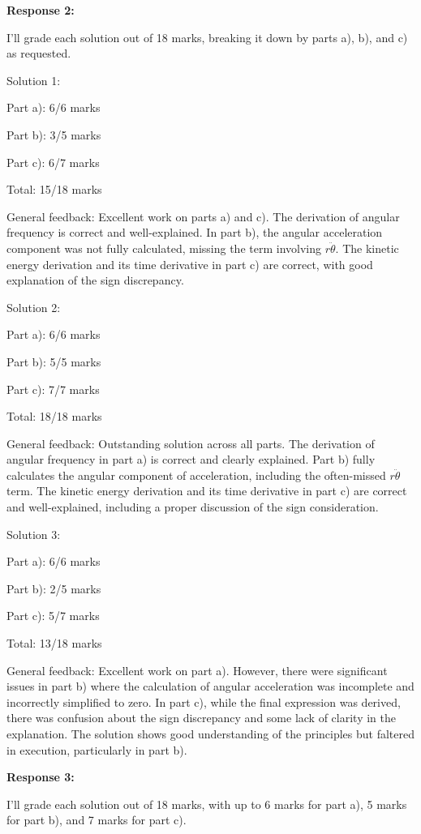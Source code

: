 \documentclass[a4paper,11pt]{article}
\begin{document}
\bigskip    
\textbf{Response 2:}

I'll grade each solution out of 18 marks, breaking it down by parts a), b), and c) as requested.

Solution 1:

Part a): 6/6 marks

Part b): 3/5 marks

Part c): 6/7 marks

Total: 15/18 marks

General feedback: Excellent work on parts a) and c). The derivation of angular frequency is correct and well-explained. In part b), the angular acceleration component was not fully calculated, missing the term involving \(r\ddot{\theta}\). The kinetic energy derivation and its time derivative in part c) are correct, with good explanation of the sign discrepancy.

Solution 2:

Part a): 6/6 marks

Part b): 5/5 marks

Part c): 7/7 marks

Total: 18/18 marks

General feedback: Outstanding solution across all parts. The derivation of angular frequency in part a) is correct and clearly explained. Part b) fully calculates the angular component of acceleration, including the often-missed \(r\ddot{\theta}\) term. The kinetic energy derivation and its time derivative in part c) are correct and well-explained, including a proper discussion of the sign consideration.

Solution 3:

Part a): 6/6 marks

Part b): 2/5 marks

Part c): 5/7 marks

Total: 13/18 marks

General feedback: Excellent work on part a). However, there were significant issues in part b) where the calculation of angular acceleration was incomplete and incorrectly simplified to zero. In part c), while the final expression was derived, there was confusion about the sign discrepancy and some lack of clarity in the explanation. The solution shows good understanding of the principles but faltered in execution, particularly in part b).

\bigskip    
\textbf{Response 3:}

I'll grade each solution out of 18 marks, with up to 6 marks for part a), 5 marks for part b), and 7 marks for part c).
\end{document}
